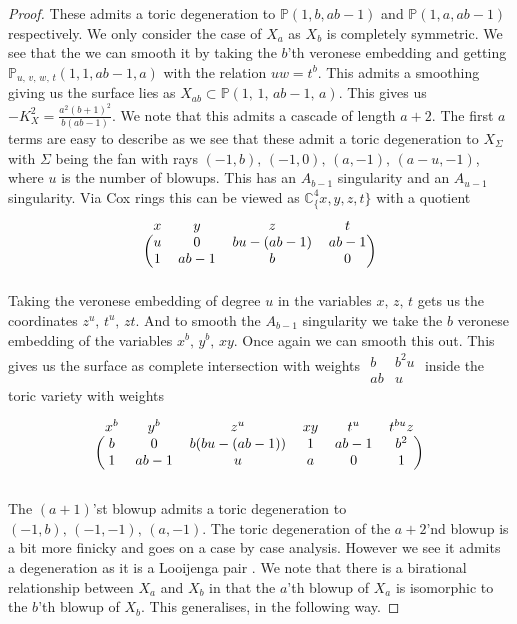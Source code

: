 \documentclass[11pt]{amsbook}
\theoremstyle{definition}
\theoremstyle{definition}
\theoremstyle{definition}
\theoremstyle{definition}
\theoremstyle{definition}
\theoremstyle{definition}
\theoremstyle{definition}
\theoremstyle{definition}
\newcommand{\mb}[1]{\mathbb{#1}}
\newcommand{\LJ}{Looijenga pair }
\begin{document}
\begin{proof}
 These admits a toric degeneration to $\mb{P}(1, b, ab-1)$ and $\mb{P}(1, a, ab-1)$ respectively. We only consider the case of $X_a$ as $X_b$ is completely symmetric. We see that the we can smooth it by taking the $b$'th veronese embedding and  getting $\mb{P}_{u,\,v,\,w,\,t}(1, 1, ab-1, a)$ with the relation $uw = t^b$. This admits a smoothing giving us the surface lies as $X_{ab} \subset \mb{P}(1,\, 1, \, ab-1, \, a)$. This gives us $-K_X^2 = \frac{a^2(b+1)^2}{b(ab-1)}$. We note that this admits a cascade of length $a+2$. The first $a$ terms are easy to describe as we see that these admit a toric degeneration to $X_\Sigma$ with $\Sigma$ being the fan with rays $(-1, b), \, (-1, 0), \, (a, -1), \, (a-u, -1)$, where $u$ is the number of blowups. This has an $A_{b-1}$ singularity and an $A_{u-1}$ singularity.
Via Cox rings this can be viewed as $\mb{C}^4_\{x, y,z,t\}$ with a quotient 
\[
\begin{blockarray}{cccc}
	x & y & z & t \\
      \begin{block}{(cccc)}
		u & 0 & bu - (ab-1) & ab-1 \\
		1 & ab-1 & b & 0 \\
      \end{block}
\end{blockarray}
\]
Taking the veronese embedding of degree $u$ in the variables $x, \, z,\,t$ gets us the coordinates $z^u, \, t^u, \, zt$. And to smooth the $A_{b-1}$ singularity we take the $b$ veronese embedding of the variables $x^b, \, y^b, \, xy$. Once again we can smooth this out. This gives us the surface as complete intersection with weights 
$\begin{matrix} b & b^2u \\ ab & u \end{matrix}$
inside the toric variety with weights

\[
\begin{blockarray}{ccc ccc}
	x^b & y^b & z^u & xy & t^u & t^{bu}z \\
      \begin{block}{(ccc ccc)}
		b & 0 & b(bu - (ab-1) ) & 1 & ab-1 & b^2\\
		1 & ab-1 & u & a & 0 & 1\\
      \end{block}
\end{blockarray}
\]

 The $(a+1)$'st blowup admits a toric degeneration to $(-1, b), \, (-1, -1), \, (a, -1)$. The toric degeneration of the $a+2$'nd blowup is a bit more finicky and goes on a case by case analysis. However we see it admits a degeneration as it is a \LJ. We note that there is a birational relationship between $X_a$ and $X_b$ in that the $a$'th blowup of $X_a$ is isomorphic to the $b$'th blowup of $X_b$.  This generalises, in the following way. 
\end{proof}
\end{document}
